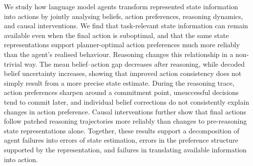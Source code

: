 \documentclass{article}
\begin{document}
We study how language model agents transform represented state information into actions by jointly analysing beliefs, action preferences, reasoning dynamics, and causal interventions. We find that task-relevant state information can remain available even when the final action is suboptimal, and that the same state representations support planner-optimal action preferences much more reliably than the agent's realised behaviour. Reasoning changes this relationship in a non-trivial way. The mean belief--action gap decreases after reasoning, while decoded belief uncertainty increases, showing that improved action consistency does not simply result from a more precise state estimate. During the reasoning trace, action preferences sharpen around a commitment point, unsuccessful decisions tend to commit later, and individual belief corrections do not consistently explain changes in action preference. Causal interventions further show that final actions follow patched reasoning trajectories more reliably than changes to pre-reasoning state representations alone. Together, these results support a decomposition of agent failures into errors of state estimation, errors in the preference structure supported by the representation, and failures in translating available information into action.











\end{document}
